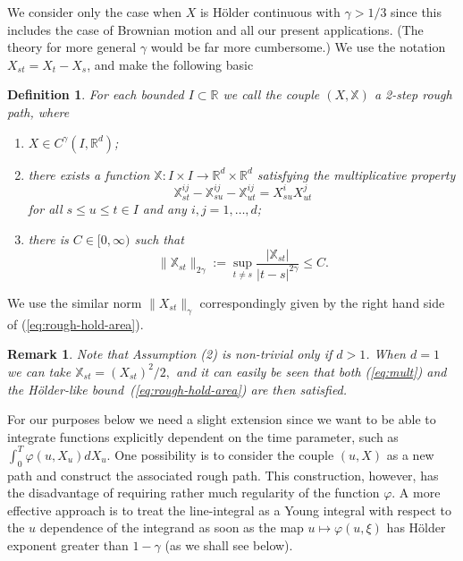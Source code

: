 \documentclass[a4paper,11pt]{article}
\newtheorem{definition}[theorem]{Definition}
\newtheorem{remark}[theorem]{Remark}
\newcommand{\R}{\mathbb{R}}
\begin{document}
We consider only the case when $X$ is H\"older continuous with $\gamma 
> 1/3$ since this includes the case of Brownian motion and all our 
present applications. (The theory for more general $\gamma$ would be 
far more cumbersome.) We use the notation $X_{st} = X_t-X_s$, and make 
the following basic

\begin{definition}
For each bounded $I \subset \R$ we call the couple $(X,\mathbb{X})$  
a \emph{2-step rough path}, where
\begin{enumerate}
\item[(1)]
$X \in C^\gamma(I,\R^d)$;

\item[(2)]%
there exists a function $\mathbb{X} : I\times I \to \R^{d}\times \R^d$ 
satisfying the \emph{multiplicative property}
  \begin{equation}
    \label{eq:mult}
  \mathbb{X}^{ij}_{st} - \mathbb{X}^{ij}_{su} - \mathbb{X}^{ij}_{ut} = 
  X^i_{su} X^j_{ut}   
  \end{equation}
for all $s \le u \le t \in I$ and any $i,j =1,\dots,d$;

\item[(3)]
there is $C \in [0,\infty)$ such that
\begin{equation}
  \label{eq:rough-hold-area}
\|\mathbb{X}_{st}\|_{2\gamma} := \sup_{t \neq s} 
\frac{|\mathbb{X}_{st}|}{|t-s|^{2\gamma}} \le C.
\end{equation}
\end{enumerate}
\end{definition}
\noindent
We use the similar norm $\|{X_{st}}\|_\gamma$ correspondingly given
by the right hand side of (\ref{eq:rough-hold-area}).

\begin{remark}
\rm{
Note that Assumption %
(2) is non-trivial only if $d>1$. When $d=1$ we can take
$
\mathbb{X}_{st} = (X_{st})^2/2,
$
and it can easily be seen that both (\ref{eq:mult}) and the
H\"older-like bound~(\ref{eq:rough-hold-area}) are then satisfied. 
}
\end{remark}


For our purposes below we need a slight extension since we want 
to be able to integrate functions explicitly dependent on the time
parameter, such as $\int_0^T \varphi(u,X_u) dX_u$. One possibility 
is to consider the couple $(u,X)$ as a new path and construct the 
associated rough path. This construction, however, has the disadvantage 
of requiring rather much regularity of the function $\varphi$. A more 
effective approach is to treat the line-integral as a Young integral 
with respect to the $u$ dependence of the integrand as soon as the 
map $u\mapsto \varphi(u,\xi)$ has H\"older exponent greater than 
$1-\gamma$ (as we shall see below).
\end{document}
